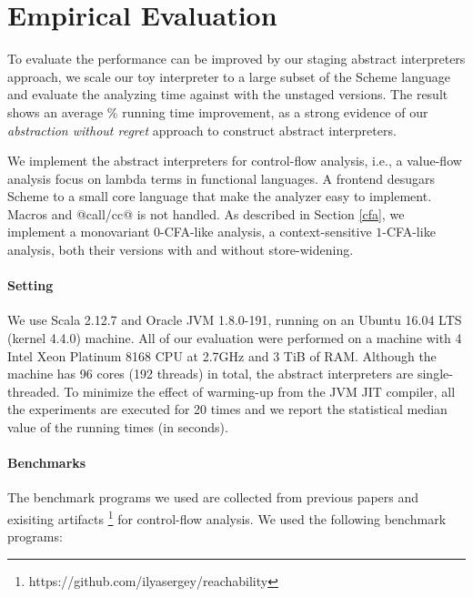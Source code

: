 \section{Empirical Evaluation} \label{evaluation}

To evaluate the performance can be improved by our staging abstract interpreters
approach, we scale our toy interpreter to a large subset of the Scheme language
and evaluate the analyzing time against with the unstaged versions. The result
shows an average \% running time improvement, as a strong evidence of
our \textit{abstraction without regret} approach to construct abstract
interpreters.

We implement the abstract interpreters for control-flow analysis, i.e., a
value-flow analysis focus on lambda terms in functional languages. A frontend
desugars Scheme to a small core language that make the analyzer easy to
implement. Macros and @call/cc@ is not handled. As described in Section
\ref{cfa}, we implement a monovariant 0-CFA-like analysis, a context-sensitive
$1$-CFA-like analysis, both their versions with and without store-widening.

\paragraph{Setting}

We use Scala 2.12.7 and Oracle JVM 1.8.0-191, running on an Ubuntu 16.04 LTS
(kernel 4.4.0) machine. All of our evaluation were performed on a machine with 4 Intel
Xeon Platinum 8168 CPU at 2.7GHz and 3 TiB of RAM. Although the machine has 96
cores (192 threads) in total, the abstract interpreters are single-threaded.
To minimize the effect of warming-up from the JVM JIT compiler, all the
experiments are executed for 20 times and we report the statistical median value
of the running times (in seconds).

\paragraph{Benchmarks} 
The benchmark programs we used are collected from previous papers
\cite{Johnson:2013:OAA:2500365.2500604, ashley:practical,
DBLP:journals/corr/abs-1102-3676} and exisiting artifacts
\footnote{https://github.com/ilyasergey/reachability} for control-flow analysis.
We used the following benchmark programs:

